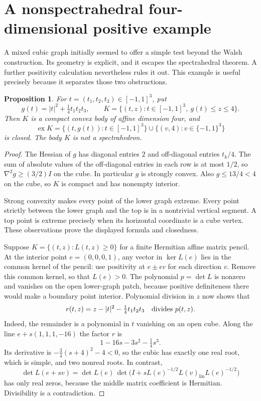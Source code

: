 \documentclass[11pt,letterpaper]{amsart}
\newtheorem{proposition}[theorem]{Proposition}
\theoremstyle{definition}
\theoremstyle{remark}
\numberwithin{equation}{section}
\DeclareMathOperator{\ex}{ex}
\begin{document}
\section{A nonspectrahedral four-dimensional positive example}
\label{sec:testbody}

A mixed cubic graph initially seemed to offer a simple test beyond the
Walsh construction. Its geometry is explicit, and it escapes the
spectrahedral theorem. A further positivity calculation nevertheless
rules it out. This example is useful precisely because it separates
those two obstructions.

\begin{proposition}\label{prop:testbody}
For $t=(t_1,t_2,t_3)\in[-1,1]^3$, put
\[
 g(t)=|t|^2+\tfrac14t_1t_2t_3,\qquad
 K=\{(t,z):t\in[-1,1]^3,\ g(t)\le z\le4\}.
\]
Then $K$ is a compact convex body of affine dimension four, and
\[
 \ex K=\{(t,g(t)):t\in[-1,1]^3\}
       \cup\{(v,4):v\in\{-1,1\}^3\}
\]
is closed. The body $K$ is not a spectrahedron.
\end{proposition}
\begin{proof}
The Hessian of $g$ has diagonal entries $2$ and off-diagonal entries
$t_k/4$. The sum of absolute values of the off-diagonal entries in
each row is at most $1/2$, so $\nabla^2g\ge(3/2)I$ on the cube.
In particular $g$ is strongly convex. Also $g\le13/4<4$ on the cube,
so $K$ is compact and has nonempty interior.

Strong convexity makes every point of the lower graph extreme. Every
point strictly between the lower graph and the top is in a nontrivial
vertical segment. A top point is extreme precisely when its horizontal
coordinate is a cube vertex. These observations prove the displayed
formula and closedness.

Suppose $K=\{(t,z):L(t,z)\ge0\}$ for a finite Hermitian affine matrix
pencil. At the interior point $e=(0,0,0,1)$, any vector in
$\ker L(e)$ lies in the common kernel of the pencil: use positivity
at $e\pm\epsilon v$ for each direction $v$. Remove this common
kernel, so that $L(e)>0$. The polynomial $p=\det L$ is nonzero and
vanishes on the open lower-graph patch, because positive definiteness
there would make a boundary point interior. Polynomial division in
$z$ now shows that
\[
                 r(t,z)=z-|t|^2-\tfrac14t_1t_2t_3
                 \quad\hbox{divides }p(t,z).
\]
Indeed, the remainder is a polynomial in $t$ vanishing on an open cube.
Along the line $e+s(1,1,1,-16)$ the factor $r$ is
\[
             1-16s-3s^2-\tfrac14s^3.
\]
Its derivative is $-\tfrac34(s+4)^2-4<0$, so the cubic has exactly
one real root, which is simple, and two nonreal roots. In contrast,
\[
 \det L(e+sv)=\det L(e)\,
 \det\bigl(I+sL(e)^{-1/2}L(v)_{\mathrm{lin}}L(e)^{-1/2}\bigr)
\]
has only real zeros, because the middle matrix coefficient is
Hermitian. Divisibility is a contradiction.
\end{proof}
\end{document}
